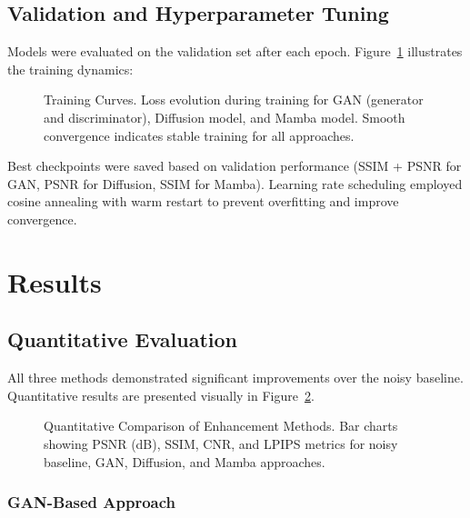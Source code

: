 \documentclass[10pt,conference,letterpaper]{IEEEtran}
\begin{document}
\subsection{Validation and Hyperparameter Tuning}

Models were evaluated on the validation set after each epoch. Figure~\ref{fig:training_curves} illustrates the training dynamics:

\begin{figure}[H]
  \centering
  \fbox{\rule{0pt}{3.5cm}\rule{4.5cm}{0pt}}
  \caption{Training Curves. Loss evolution during training for GAN (generator and discriminator), Diffusion model, and Mamba model. Smooth convergence indicates stable training for all approaches.}
  \label{fig:training_curves}
\end{figure}

Best checkpoints were saved based on validation performance (SSIM + PSNR for GAN, PSNR for Diffusion, SSIM for Mamba). Learning rate scheduling employed cosine annealing with warm restart to prevent overfitting and improve convergence.

\section{Results}
\label{sec:results}

\subsection{Quantitative Evaluation}

All three methods demonstrated significant improvements over the noisy baseline. Quantitative results are presented visually in Figure~\ref{fig:quantitative_results}.

\begin{figure}[H]
  \centering
  \fbox{\rule{0pt}{3cm}\rule{4.5cm}{0pt}}
  \caption{Quantitative Comparison of Enhancement Methods. Bar charts showing PSNR (dB), SSIM, CNR, and LPIPS metrics for noisy baseline, GAN, Diffusion, and Mamba approaches.}
  \label{fig:quantitative_results}
\end{figure}

\subsubsection{GAN-Based Approach}
\end{document}
